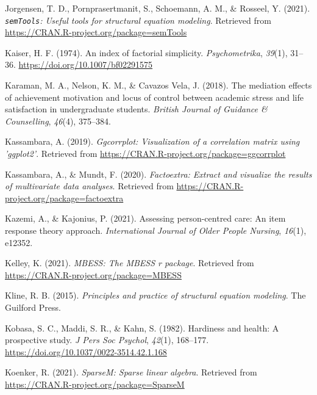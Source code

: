\documentclass[
  man]{apa6}
\newlength{\cslhangindent}
\newlength{\cslentryspacingunit} %
\newenvironment{CSLReferences}[2] %
 {%
  \setlength{\parindent}{0pt}
  \ifodd #1
  \let\oldpar\par
  \def\par{\hangindent=\cslhangindent\oldpar}
  \fi
  \setlength{\parskip}{#2\cslentryspacingunit}
 }%
 {}
\begin{document}
\begin{CSLReferences}{1}{0}
\leavevmode{}%
Jorgensen, T. D., Pornprasertmanit, S., Schoemann, A. M., \& Rosseel, Y. (2021). \emph{\texttt{semTools}: {U}seful tools for structural equation modeling}. Retrieved from \url{https://CRAN.R-project.org/package=semTools}

\leavevmode{}%
Kaiser, H. F. (1974). An index of factorial simplicity. \emph{Psychometrika}, \emph{39}(1), 31--36. \url{https://doi.org/10.1007/bf02291575}

\leavevmode{}%
Karaman, M. A., Nelson, K. M., \& Cavazos Vela, J. (2018). The mediation effects of achievement motivation and locus of control between academic stress and life satisfaction in undergraduate students. \emph{British Journal of Guidance \& Counselling}, \emph{46}(4), 375--384.

\leavevmode{}%
Kassambara, A. (2019). \emph{Ggcorrplot: Visualization of a correlation matrix using 'ggplot2'}. Retrieved from \url{https://CRAN.R-project.org/package=ggcorrplot}

\leavevmode{}%
Kassambara, A., \& Mundt, F. (2020). \emph{Factoextra: Extract and visualize the results of multivariate data analyses}. Retrieved from \url{https://CRAN.R-project.org/package=factoextra}

\leavevmode{}%
Kazemi, A., \& Kajonius, P. (2021). Assessing person-centred care: An item response theory approach. \emph{International Journal of Older People Nursing}, \emph{16}(1), e12352.

\leavevmode{}%
Kelley, K. (2021). \emph{MBESS: The MBESS r package}. Retrieved from \url{https://CRAN.R-project.org/package=MBESS}

\leavevmode{}%
Kline, R. B. (2015). \emph{Principles and practice of structural equation modeling}. The Guilford Press.

\leavevmode{}%
Kobasa, S. C., Maddi, S. R., \& Kahn, S. (1982). Hardiness and health: A prospective study. \emph{J Pers Soc Psychol}, \emph{42}(1), 168--177. \url{https://doi.org/10.1037/0022-3514.42.1.168}

\leavevmode{}%
Koenker, R. (2021). \emph{SparseM: Sparse linear algebra}. Retrieved from \url{https://CRAN.R-project.org/package=SparseM}


\end{CSLReferences}
\end{document}
